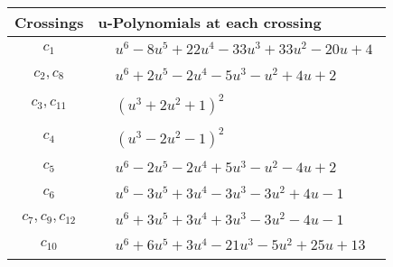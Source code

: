 \documentclass[1p]{elsarticle_modified}
\theoremstyle{definition}
\begin{document}
\begin{tabular}{m{50pt}|m{274pt}}
Crossings & \hspace{64pt}u-Polynomials at each crossing \\
\hline $$\begin{aligned}c_{1}\end{aligned}$$&$\begin{aligned}
&u^6-8 u^5+22 u^4-33 u^3+33 u^2-20 u+4
\end{aligned}$\\
\hline $$\begin{aligned}c_{2},c_{8}\end{aligned}$$&$\begin{aligned}
&u^6+2 u^5-2 u^4-5 u^3- u^2+4 u+2
\end{aligned}$\\
\hline $$\begin{aligned}c_{3},c_{11}\end{aligned}$$&$\begin{aligned}
&(u^3+2 u^2+1)^2
\end{aligned}$\\
\hline $$\begin{aligned}c_{4}\end{aligned}$$&$\begin{aligned}
&(u^3-2 u^2-1)^2
\end{aligned}$\\
\hline $$\begin{aligned}c_{5}\end{aligned}$$&$\begin{aligned}
&u^6-2 u^5-2 u^4+5 u^3- u^2-4 u+2
\end{aligned}$\\
\hline $$\begin{aligned}c_{6}\end{aligned}$$&$\begin{aligned}
&u^6-3 u^5+3 u^4-3 u^3-3 u^2+4 u-1
\end{aligned}$\\
\hline $$\begin{aligned}c_{7},c_{9},c_{12}\end{aligned}$$&$\begin{aligned}
&u^6+3 u^5+3 u^4+3 u^3-3 u^2-4 u-1
\end{aligned}$\\
\hline $$\begin{aligned}c_{10}\end{aligned}$$&$\begin{aligned}
&u^6+6 u^5+3 u^4-21 u^3-5 u^2+25 u+13
\end{aligned}$\\
\hline
\end{tabular}\\~\\
\end{document}
